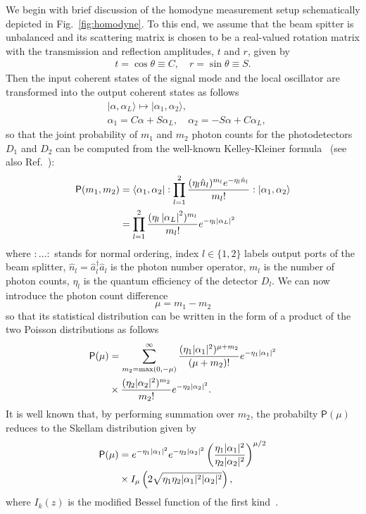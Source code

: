 \documentclass[%
reprint,
superscriptaddress,
 amsmath,amssymb,amsfonts,
 aps,
 pra,
 longbibliography
]{revtex4-2}
\newcommand{\ket}[1]{\ensuremath{|{#1}\rangle}}
\newcommand{\bra}[1]{\ensuremath{\langle{#1}|}}
\newcommand{\hcnj}[1]{{#1}^{\dagger}}
\newcommand{\prob}{\mathsf{P}}
\begin{document}
We begin with brief discussion
of the homodyne measurement setup
schematically depicted in Fig.~\ref{fig:homodyne}.
To this end, we assume that the beam spitter is unbalanced
and its scattering matrix is chosen to be a real-valued
rotation matrix with the transmission and reflection amplitudes,
$t$ and $r$, given by
\begin{align}
  \label{eq:BS-amplitudes}
  t=\cos\theta\equiv C,
  \quad
  r=\sin\theta\equiv S.
\end{align}
Then the input coherent states
of the signal mode and the local oscillator 
are transformed into the output coherent states
as follows
\begin{align}
  \label{eq:BS}
  &
    \ket{\alpha,\alpha_L}\mapsto\ket{\alpha_1,\alpha_2},
  \\
  &
    \label{eq:amplitudes}
    \alpha_1=C\alpha+S\alpha_L,\quad
    \alpha_2=-S\alpha+C\alpha_L,
\end{align}
so that
the joint probability of $m_1$ and $m_2$ photon counts
for the photodetectors $D_1$ and $D_2$
can be computed from the well-known Kelley-Kleiner formula~\cite{Kelley:pr:1964}
(see also Ref.~\cite{Vogel:pra:1993}):
\begin{align}
    \label{eq:1}
    \prob(m_1,m_2)&=
    \bra{\alpha_1,\alpha_2}:\prod_{l=1}^{2}\frac{(\eta_l\hat{n}_l)^{m_l}e^{-\eta_l\hat{n}_l}}{m_l!}:\ket{\alpha_1,\alpha_2}
    \notag
  \\
  &
 =\prod_{l=1}^{2}\frac{(\eta_l\left|\alpha_L\right|^2)^{m_l}}{m_l!}e^{-\eta_l\left|\alpha_L\right|^2}    
\end{align}
where
$:\ldots:$ stands for normal ordering,
index $l\in\{1,2\}$ labels output ports of the beam splitter,
$\hat{n}_l=\hcnj{\hat{a}}_l\hat{a}_l$ is the photon number operator,
$m_l$ is the number of photon counts,
$\eta_l$ is the quantum efficiency of the detector $D_l$.
We can now introduce the photon count difference
\begin{equation}
  \label{eq:dleta-m}
    \mu = m_1-m_2
  \end{equation}
  so that its statistical distribution %
  can be written in
  the form of a product of the two Poisson distributions as follows 
\begin{align}
\label{eq:poisson}  
    \prob(\mu) &=\sum_{m_2=\max(0,-\mu)}^{\infty}
    \frac{(\eta_1|\alpha_1|^2)^{\mu+m_2}}{(\mu+m_2)!}e^{-\eta_1|\alpha_1|^2}
    \notag
  \\
  &
    \times
\frac{(\eta_2|\alpha_2|^2)^{m_2}}{m_2!}e^{-\eta_2|\alpha_2|^2}.
\end{align}
It is well known that, by performing summation over $m_2$,
the probabilty $\prob(\mu)$ reduces to
the Skellam distribution given by~\cite{skellam1946frequency}
\begin{align}
  \label{eq:accurate}
  \prob(\mu)&=e^{-\eta_1|\alpha_1|^2}e^{-\eta_2|\alpha_2|^2}
    \left(\frac{\eta_1|\alpha_1|^2}{\eta_2|\alpha_2|^2}\right)^{\mu/2}
    \notag
  \\
  &
    \times
I_{\mu}\left(2\sqrt{\eta_1\eta_2|\alpha_1|^2|\alpha_2|^2}\right),
\end{align}
where $I_k(z)$ is the modified Bessel function of the first kind~\cite{NIST:hndbk:2010}.
\end{document}

